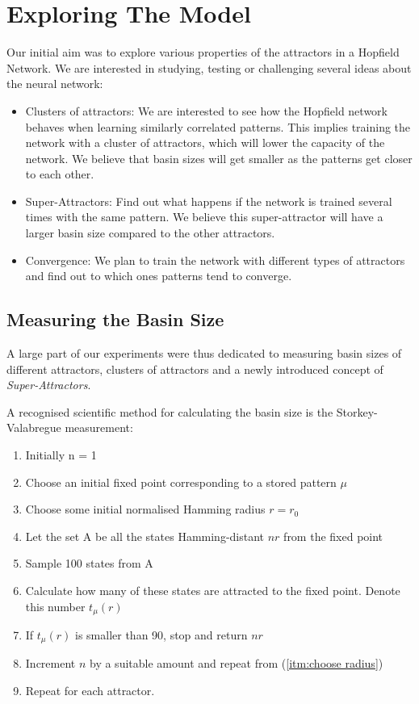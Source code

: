 \chapter{Exploring The Model}


Our initial aim was to explore various properties of the attractors in a Hopfield Network. We are interested in studying, testing or challenging several ideas about the neural network:
\begin{itemize}
 \item Clusters of attractors: We are interested to see how the Hopfield network behaves when learning similarly correlated patterns. This implies training the network with a cluster of attractors, which will lower the capacity of the network. We believe that basin sizes will get smaller as the patterns get closer to each other.
 \item Super-Attractors: Find out what happens if the network is trained several times with the same pattern. We believe this super-attractor will have a larger basin size compared to the other attractors.
 \item Convergence: We plan to train the network with different types of attractors and find out to which ones patterns tend to converge.
\end{itemize}


\section{Measuring the Basin Size}

 A large part of our experiments were thus dedicated to measuring basin sizes of different attractors, clusters of attractors and a newly introduced concept of \emph{Super-Attractors}.

 A recognised scientific method for calculating the basin size is the Storkey-Valabregue measurement:

 \begin{enumerate}
  \item Initially n = 1
  \item Choose an initial fixed point corresponding to a stored pattern \(\mu\)
  \item \label{itm:choose radius} Choose some initial normalised Hamming radius \(r=r_{0}\)
  \item Let the set A be all the states Hamming-distant \( nr \) from the fixed point
  \item Sample 100 states from A
  \item Calculate how many of these states are attracted to the fixed point. Denote this number \( t_{\mu}(r) \)
  \item If \( t_{\mu}(r) \) is smaller than 90, stop and return \(nr\)
  \item Increment \(n\) by a suitable amount and repeat from (\ref{itm:choose radius})
  \item Repeat for each attractor.
 \end{enumerate}

